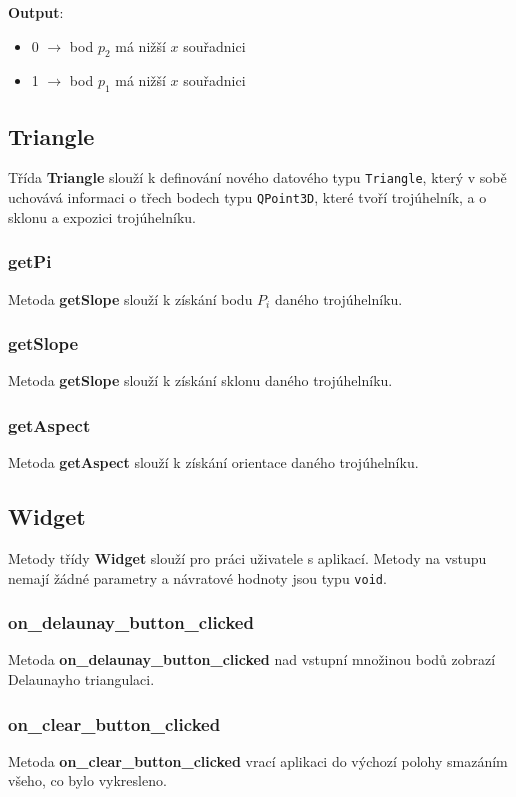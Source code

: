 \documentclass[a4paper, 12pt]{article}
\begin{document}
\textbf{Output}:
\begin{itemize}
\item 0 $\rightarrow$ bod $p_2$ má nižší $x$ souřadnici
\item 1 $\rightarrow$ bod $p_1$ má nižší $x$ souřadnici
\end{itemize}

\subsection{Triangle}
Třída \textbf{Triangle} slouží k definování nového datového typu \texttt{Triangle}, který v sobě uchovává informaci o třech bodech typu \texttt{QPoint3D}, které tvoří trojúhelník, a o sklonu a expozici trojúhelníku.

\subsubsection*{getPi}
Metoda \textbf{getSlope} slouží k získání bodu $P_i$ daného trojúhelníku. 

\subsubsection*{getSlope}
Metoda \textbf{getSlope} slouží k získání sklonu daného trojúhelníku. 

\subsubsection*{getAspect}
Metoda \textbf{getAspect} slouží k získání orientace daného trojúhelníku. 


\subsection{Widget}
Metody třídy \textbf{Widget} slouží pro práci uživatele s aplikací. Metody na vstupu nemají žádné parametry a návratové hodnoty jsou typu \texttt{void}.

\subsubsection*{on\_delaunay\_button\_clicked}
Metoda \textbf{on\_delaunay\_button\_clicked} nad vstupní množinou bodů zobrazí Delaunayho triangulaci. 

\subsubsection*{on\_clear\_button\_clicked}
Metoda \textbf{on\_clear\_button\_clicked} vrací aplikaci do výchozí polohy smazáním všeho, co bylo vykresleno. 
\end{document}
